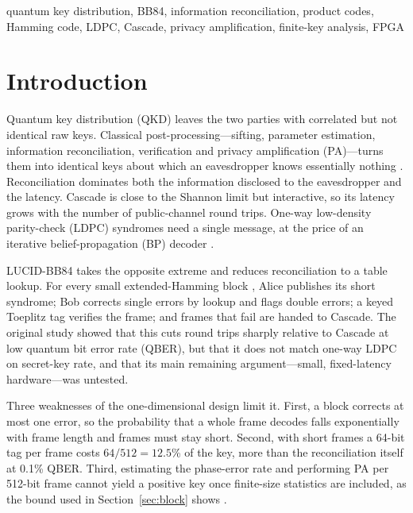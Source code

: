 \documentclass[conference]{IEEEtran}
\begin{document}
\begin{IEEEkeywords}
quantum key distribution, BB84, information reconciliation, product codes, Hamming code, LDPC, Cascade, privacy amplification, finite-key analysis, FPGA
\end{IEEEkeywords}

\section{Introduction}
Quantum key distribution (QKD) leaves the two parties with correlated but not identical raw keys. Classical post-processing---sifting, parameter estimation, information reconciliation, verification and privacy amplification (PA)---turns them into identical keys about which an eavesdropper knows essentially nothing \cite{bb84,scarani2009,pirandola2020}. Reconciliation dominates both the information disclosed to the eavesdropper and the latency. Cascade \cite{cascade,demystifying} is close to the Shannon limit but interactive, so its latency grows with the number of public-channel round trips. One-way low-density parity-check (LDPC) syndromes \cite{gallager1962,elkouss2009,elkouss2011} need a single message, at the price of an iterative belief-propagation (BP) decoder \cite{mackay1999,kschischang2001}.

LUCID-BB84 takes the opposite extreme and reduces reconciliation to a table lookup. For every small extended-Hamming block \cite{hamming1950}, Alice publishes its short syndrome; Bob corrects single errors by lookup and flags double errors; a keyed Toeplitz tag verifies the frame; and frames that fail are handed to Cascade. The original study showed that this cuts round trips sharply relative to Cascade at low quantum bit error rate (QBER), but that it does not match one-way LDPC on secret-key rate, and that its main remaining argument---small, fixed-latency hardware---was untested.

Three weaknesses of the one-dimensional design limit it. First, a block corrects at most one error, so the probability that a whole frame decodes falls exponentially with frame length and frames must stay short. Second, with short frames a 64-bit tag per frame costs $64/512=12.5$\% of the key, more than the reconciliation itself at 0.1\% QBER. Third, estimating the phase-error rate and performing PA per 512-bit frame cannot yield a positive key once finite-size statistics are included, as the bound used in Section~\ref{sec:block} shows \cite{tomamichel2012}.
\end{document}
